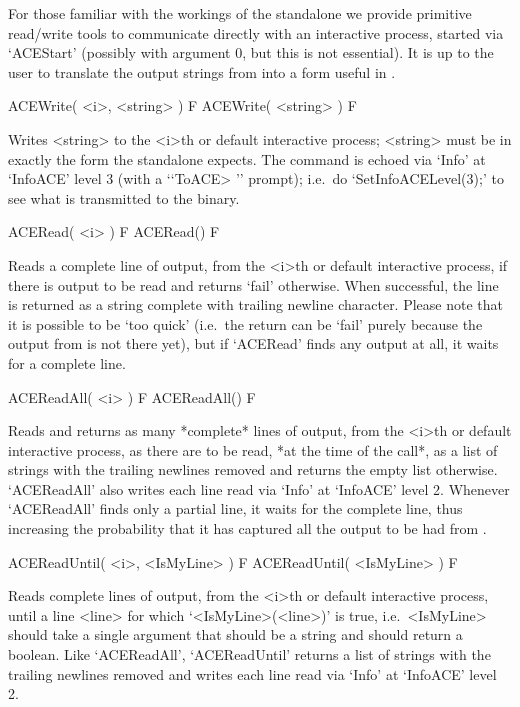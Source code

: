 For those familiar with the  workings  of  the  {\ACE}  standalone  we
provide primitive read/write tools to  communicate  directly  with  an
interactive {\ACE} process,  started  via  `ACEStart'  (possibly  with
argument 0, but this is not essential).  It  is  up  to  the  user  to
translate the output strings from {\ACE} into a form useful in {\GAP}.

\beginitems

\>ACEWrite( <i>, <string> ) F
\>ACEWrite( <string> ) F

Writes <string> to the <i>th or default  interactive  {\ACE}  process;
<string> must be in exactly the form the  {\ACE}  standalone  expects.
The command is  echoed  via  `Info'  at  `InfoACE'  level  3  (with  a
\lq{}`ToACE> '' prompt); i.e.~do `SetInfoACELevel(3);' to see what  is
transmitted to the {\ACE} binary.


\>ACERead( <i> ) F
\>ACERead() F

Reads a complete line of {\ACE} output,  from  the  <i>th  or  default
interactive {\ACE} process, if there is output to be read and  returns
`fail' otherwise. When successful, the line is returned  as  a  string
complete with trailing newline  character.  Please  note  that  it  is
possible to be \lq{}too quick' (i.e.~the return can be  `fail'  purely
because the output from {\ACE} is not there  yet),  but  if  `ACERead'
finds any output at all, it waits for a complete line.

\>ACEReadAll( <i> ) F
\>ACEReadAll() F

Reads and returns as many *complete* lines of {\ACE} output, from  the
<i>th or default interactive {\ACE} process, as there are to be  read,
*at the time of the call*, as a list  of  strings  with  the  trailing
newlines removed and returns the empty  list  otherwise.  `ACEReadAll'
also writes each line read via `Info' at `InfoACE' level  2.  Whenever
`ACEReadAll' finds only a partial line,  it  waits  for  the  complete
line, thus increasing the probability that it  has  captured  all  the
output to be had from {\ACE}.

\>ACEReadUntil( <i>, <IsMyLine> ) F
\>ACEReadUntil( <IsMyLine> ) F

Reads complete lines of {\ACE}  output,  from  the  <i>th  or  default
interactive  {\ACE}  process,  until   a   line   <line>   for   which
`<IsMyLine>(<line>)' is true, i.e.~<IsMyLine>  should  take  a  single
argument that should be a string and should  return  a  boolean.  Like
`ACEReadAll', `ACEReadUntil'  returns  a  list  of  strings  with  the
trailing newlines removed and writes each  line  read  via  `Info'  at
`InfoACE' level 2.

